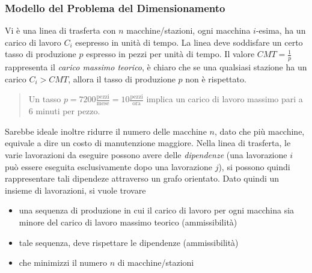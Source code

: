 \documentclass[10pt, letterpaper]{report}
\begin{document}
\subsubsection{Modello del Problema del Dimensionamento}
Vi è una linea di trasferta con $n$ macchine/stazioni, ogni macchina $i$-esima, ha un carico di lavoro 
$C_i$ esepresso in unità di tempo. La linea deve soddisfare un certo tasso di produzione $p$ espresso in 
pezzi per unità di tempo. Il valore $CMT=\frac{1}{p}$ rappresenta il \textit{carico massimo teorico}, è 
chiaro che se una qualsiasi stazione ha un carico $C_i>CMT$, allora il tasso di produzione $p$ non è 
rispettato.\begin{quote}
    Un tasso $p=7200\frac{\text{pezzi}}{\text{mese}}=10\frac{\text{pezzi}}{\text{ora}}$ implica un 
    carico di lavoro massimo pari a $6$ minuti per pezzo. 
\end{quote}
Sarebbe ideale inoltre ridurre il numero delle macchine $n$, dato che più macchine, equivale a dire un costo 
di manutenzione maggiore. Nella linea di trasferta, le varie lavorazioni da eseguire possono avere 
delle \textit{dipendenze} (una lavorazione $i$ può essere eseguita esclusivamente dopo una lavorazione 
$j$), si possono quindi rappresentare tali dipendeze attraverso un grafo orientato. \acc 
Dato quindi un insieme di lavorazioni, si vuole trovare \begin{itemize}
    \item una sequenza di produzione in cui il carico di lavoro per ogni macchina sia minore del carico di lavoro massimo teorico (ammissibilità)
    \item tale sequenza, deve rispettare le dipendenze (ammissibilità)
    \item che minimizzi il numero $n$ di macchine/stazioni
\end{itemize}
\end{document}
